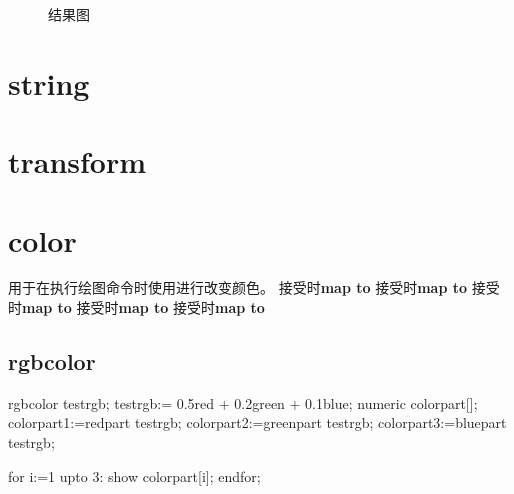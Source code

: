 \begin{figure}[H]
    \caption{结果图}
    \label{fig:thelabel}
    \centering
\end{figure}

\section{string}
\label{sec:string}


\section{transform}
\label{sec:transform}


\section{color}
\label{sec:color}

\noindent{}用于在执行绘图命令时使用进行改变颜色。\newline
{}接受时{\bf map to}\newline
{}接受时{\bf map to}\newline
{}接受时{\bf map to}\newline
{}接受时{\bf map to}\newline
{}接受时{\bf map to}\newline

\subsection{rgbcolor}
\label{subsec:rgbcolor}

\begin{mpostcode}
    rgbcolor testrgb;
    testrgb:= 0.5red + 0.2green + 0.1blue;
    numeric colorpart[];
    colorpart1:=redpart testrgb;
    colorpart2:=greenpart testrgb;
    colorpart3:=bluepart testrgb;

    for i:=1 upto 3: show colorpart[i]; endfor;
\end{mpostcode}

